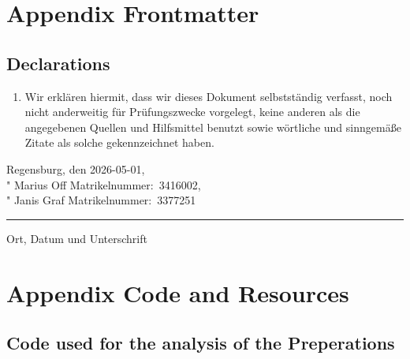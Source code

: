 \documentclass[12pt, oneside, a4paper]{scrreprt}
\begin{document}
            \cleardoublepage







    \appendix
        
    \chapter{Appendix Frontmatter}

        \section{Declarations}\label{app:statutory}

            \begin{enumerate}
                \item Wir erklären hiermit, dass wir dieses Dokument selbstständig verfasst, noch nicht anderweitig für Prüfungszwecke vorgelegt, keine anderen als die angegebenen Quellen und Hilfsmittel benutzt sowie wörtliche und sinngemäße Zitate als solche gekennzeichnet haben.
            \end{enumerate}

            \vskip22mm
            Regensburg, den 2026-05-01, \\
            "\hskip6cm Marius Off\hskip2cm Matrikelnummer:~3416002,\\
            "\hskip6cm Janis Graf\hskip2cm Matrikelnummer:~3377251
            \vskip1mm
            \hrule
            \vskip1mm
            {\footnotesize Ort, Datum und Unterschrift}

            \vspace{12mm}

            \cleardoublepage

        \listoffigures


            \cleardoublepage

    \chapter{Appendix Code and Resources}



            \section{Code used for the analysis of the Preperations}
            
\end{document}
